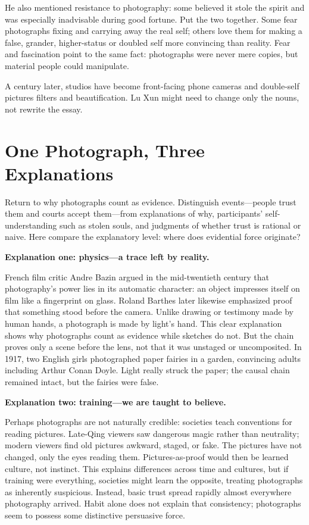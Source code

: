 He also mentioned resistance to photography: some believed it stole the spirit and was especially inadvisable during good fortune. Put the two together. Some fear photographs fixing and carrying away the real self; others love them for making a false, grander, higher-status or doubled self more convincing than reality. Fear and fascination point to the same fact: photographs were never mere copies, but material people could manipulate.

A century later, studios have become front-facing phone cameras and double-self pictures filters and beautification. Lu Xun might need to change only the nouns, not rewrite the essay.

\section{One Photograph, Three Explanations}
Return to why photographs count as evidence. Distinguish events---people trust them and courts accept them---from explanations of why, participants' self-understanding such as stolen souls, and judgments of whether trust is rational or naive. Here compare the explanatory level: where does evidential force originate?

\textbf{Explanation one: physics---a trace left by reality.}

French film critic Andre Bazin argued in the mid-twentieth century that photography's power lies in its automatic character: an object impresses itself on film like a fingerprint on glass. Roland Barthes later likewise emphasized proof that something stood before the camera. Unlike drawing or testimony made by human hands, a photograph is made by light's hand. This clear explanation shows why photographs count as evidence while sketches do not. But the chain proves only a scene before the lens, not that it was unstaged or uncomposited. In 1917, two English girls photographed paper fairies in a garden, convincing adults including Arthur Conan Doyle. Light really struck the paper; the causal chain remained intact, but the fairies were false.

\textbf{Explanation two: training---we are taught to believe.}

Perhaps photographs are not naturally credible: societies teach conventions for reading pictures. Late-Qing viewers saw dangerous magic rather than neutrality; modern viewers find old pictures awkward, staged, or fake. The pictures have not changed, only the eyes reading them. Pictures-as-proof would then be learned culture, not instinct. This explains differences across time and cultures, but if training were everything, societies might learn the opposite, treating photographs as inherently suspicious. Instead, basic trust spread rapidly almost everywhere photography arrived. Habit alone does not explain that consistency; photographs seem to possess some distinctive persuasive force.

